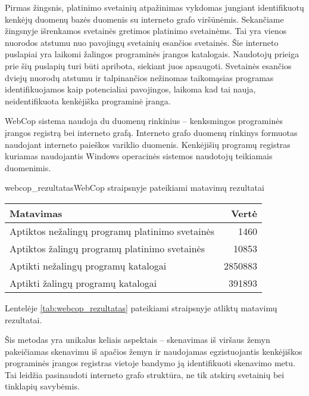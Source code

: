 Pirmas žingsnis, platinimo svetainių atpažinimas vykdomas jungiant identifikuotų kenkėjų duomenų bazės duomenis su interneto grafo viršūnėmis. Sekančiame žingsnyje išrenkamos svetainės gretimos platinimo svetainėms. Tai yra vienos nuorodos atstumu nuo pavojingų svetainių esančios svetainės. Šie interneto puslapiai yra laikomi žalingos programinės įrangos katalogais. Naudotojų prieiga prie šių puslapių turi būti apribota, siekiant juos apsaugoti. Svetainės esančios dviejų nuorodų atstumu ir talpinančios nežinomas taikomąsias programas identifikuojamos kaip potencialiai pavojingos, laikoma kad tai nauja, neidentifikuota kenkėjiška programinė įranga.

WebCop sistema naudoja du duomenų rinkinius -- kenksmingos programinės įrangos registrą bei interneto grafą. Interneto grafo duomenų rinkinys formuotas naudojant interneto paieškos variklio duomenis. Kenkėjišių programų registras kuriamas naudojantis Windows operacinės sistemos naudotojų teikiamais duomenimis.

\begin{ktutable}{webcop_rezultatas}{WebCop straipsnyje pateikiami matavimų rezultatai}
    \begin{tabular}{| l | r |}
     \hline
        Matavimas & Vertė \\ \hline
        Aptiktos nežalingų programų platinimo svetainės & 1460 \\ \hline
        Aptiktos žalingų programų platinimo svetainės & 10853 \\ \hline
        Aptikti nežalingų programų katalogai & 2850883 \\ \hline
        Aptikti žalingų programų katalogai & 391893 \\ \hline
    \end{tabular}
\end{ktutable}

Lentelėje \vref{tab:webcop_rezultatas} pateikiami straipsnyje atliktų matavimų rezultatai.

Šis metodas yra unikalus keliais aspektais -- skenavimas iš viršaus žemyn pakeičiamas skenavimu iš apačios žemyn ir naudojamas egzistuojantis kenkėjiškos programinės įrangos registras vietoje bandymo ją identifikuoti skenavimo metu. Tai leidžia pasinaudoti interneto grafo struktūra, ne tik atskirų svetainių bei tinklapių savybėmis.